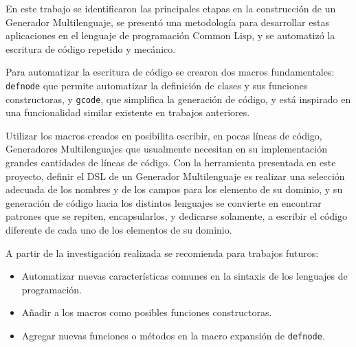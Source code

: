 \begin{conclusions}
En este trabajo se identificaron las principales etapas en la construcción de un Generador Multilenguaje, se presentó una metodología para desarrollar estas aplicaciones en el lenguaje de programación Common Lisp, y se automatizó la escritura de código repetido y mecánico.   

Para automatizar la escritura de código se crearon dos macros fundamentales: \texttt{defnode} que permite automatizar la definición de clases y sus funciones constructoras, y \texttt{gcode}, que simplifica la generación de código, y está inspirado en una funcionalidad similar existente en trabajos anteriores.

Utilizar los macros creados en {\gagm} posibilita escribir, en pocas líneas de código, Generadores Multilenguajes que usualmente necesitan en su implementación grandes cantidades de líneas de código. Con la herramienta presentada en este proyecto, definir el DSL de un Generador Multilenguaje es realizar una selección adecuada de los nombres y de los campos para los elemento de su dominio, y su generación de código hacia los distintos lenguajes se convierte en encontrar patrones que se repiten, encapsularlos, y dedicarse solamente, a escribir el código diferente de cada uno de los elementos de su dominio. 
\end{conclusions}

\begin{recomendations}
	A partir de la investigación realizada se recomienda para trabajos futuros:
	
	\begin{itemize}
		\item Automatizar nuevas características comunes en la sintaxis de los lenguajes de programación.
		\item Añadir a los macros como posibles funciones constructoras.
		\item Agregar nuevas funciones o métodos en la macro expansión de \texttt{defnode}.
	\end{itemize}
\end{recomendations}

